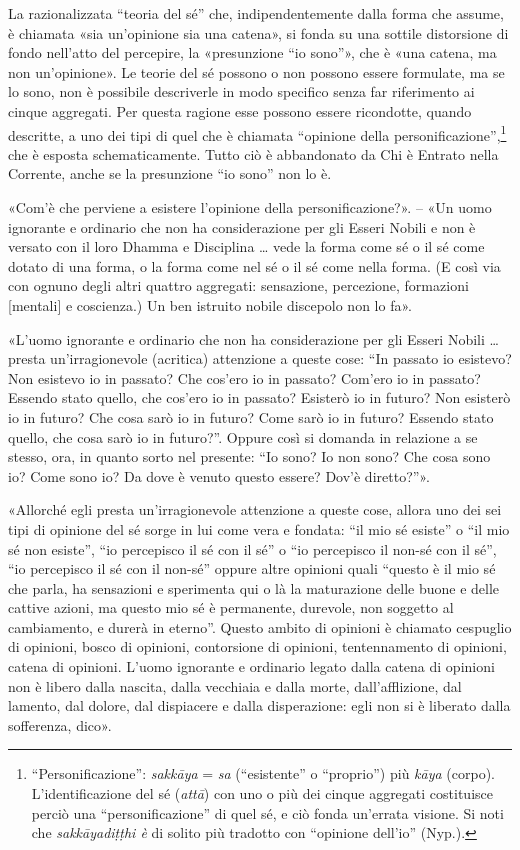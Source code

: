  La razionalizzata “teoria del sé” che,
indipendentemente dalla forma che assume, è chiamata «sia un’opinione sia una
catena», si fonda su una sottile distorsione di fondo nell’atto del percepire,
la «presunzione “io sono”», che è «una catena, ma non un’opinione». Le teorie
del sé possono o non possono essere formulate, ma se lo sono, non è possibile
descriverle in modo specifico senza far riferimento ai cinque aggregati. Per
questa ragione esse possono essere ricondotte, quando descritte, a uno dei tipi
di quel che è chiamata “opinione della
personificazione”,\footnote{“Personificazione”: \emph{sakkāya} = \emph{sa}
  (“esistente” o “proprio”) più \emph{kāya} (corpo). L’identificazione del sé
  (\emph{attā}) con uno o più dei cinque aggregati costituisce perciò una
  “personificazione” di quel sé, e ciò fonda un’errata visione. Si noti che
  \emph{sakkāyadiṭṭhi è} di solito più tradotto con “opinione dell’io” (Nyp.).}
che è esposta schematicamente. Tutto ciò è abbandonato da Chi è Entrato nella
Corrente, anche se la presunzione “io sono” non lo è.

\label{pag259}%
 «Com’è che perviene a esistere l’opinione della
personificazione?». – «Un uomo ignorante e ordinario che non ha considerazione
per gli Esseri Nobili e non è versato con il loro Dhamma e Disciplina … vede la
forma come sé o il sé come dotato di una forma, o la forma come nel sé o il sé
come nella forma. (E così via con ognuno degli altri quattro aggregati:
sensazione, percezione, formazioni [mentali] e coscienza.) Un ben istruito
nobile discepolo non lo fa».


«L’uomo ignorante e ordinario che non ha considerazione per gli Esseri Nobili …
presta un’irragionevole (acritica) attenzione a queste cose: “In passato io
esistevo? Non esistevo io in passato? Che cos’ero io in passato? Com’ero io in
passato? Essendo stato quello, che cos’ero io in passato? Esisterò io in futuro?
Non esisterò io in futuro? Che cosa sarò io in futuro? Come sarò io in futuro?
Essendo stato quello, che cosa sarò io in futuro?”. Oppure così si domanda in
relazione a se stesso, ora, in quanto sorto nel presente: “Io sono? Io non sono?
Che cosa sono io? Come sono io? Da dove è venuto questo essere? Dov’è
diretto?”».

«Allorché egli presta un’irragionevole attenzione a queste cose, allora uno dei
sei tipi di opinione del sé sorge in lui come vera e fondata: “il mio sé esiste”
o “il mio sé non esiste”, “io percepisco il sé con il sé” o “io percepisco il
non-sé con il sé”, “io percepisco il sé con il non-sé” oppure altre opinioni
quali “questo è il mio sé che parla, ha sensazioni e sperimenta qui o là la
maturazione delle buone e delle cattive azioni, ma questo mio sé è permanente,
durevole, non soggetto al cambiamento, e durerà in eterno”. Questo ambito di
opinioni è chiamato cespuglio di opinioni, bosco di opinioni, contorsione di
opinioni, tentennamento di opinioni, catena di opinioni. L’uomo ignorante e
ordinario legato dalla catena di opinioni non è libero dalla nascita, dalla
vecchiaia e dalla morte, dall’afflizione, dal lamento, dal dolore, dal
dispiacere e dalla disperazione: egli non si è liberato dalla sofferenza, dico».

